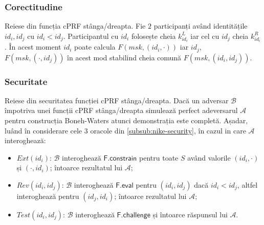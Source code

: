 \documentclass[oneside, 12pt]{book}
\begin{document}
\subsubsection{Corectitudine}

Reiese din funcția cPRF stânga/dreapta. Fie $2$ participanți având identitățile $id_i, id_j$ cu $id_i < id_j$. Participantul cu $id_i$ folosește cheia $k^{L}_{id_i}$ iar cel cu $id_j$ cheia $k^{R}_{id_i}$. În acest moment $id_i$ poate calcula $F(msk, (id_i, \cdot))$ iar $id_j$, $F(msk, (\cdot, id_j))$ în acest mod stabilind cheia comună $F(msk, (id_i, id_j))$.

\subsubsection{Securitate}

Reiese din securitatea funcției cPRF stânga/dreapta. Dacă un adversar $\mathcal{B}$ împotriva unei funcții cPRF stânga/dreapta simulează perfect adeversarul $\mathcal{A}$ pentru construcția Boneh-Waters atunci demonstrația este completă. Așadar, luând în considerare cele $3$ oracole din \ref{subsub:nike-security}, în cazul in care $\mathcal{A}$ interoghează:
\begin{itemize}
	\item $Ext(id_i)$: $\mathcal{B}$ interoghează $\mathsf{F.constrain}$ pentru toate $S$ având valorile $(id_i, \cdot)$ și $(\cdot, id_i)$; întoarce rezultatul lui $\mathcal{A}$;
	\item $Rev(id_i, id_j)$: $\mathcal{B}$ interoghează $\mathsf{F.eval}$ pentru $(id_i, id_j)$ dacă $id_i < id_j$, altfel interoghează pentru $(id_j, id_i)$; întoarce rezultatul lui $\mathcal{A}$;
	\item $Test(id_i, id_j)$: $\mathcal{B}$ interoghează $\mathsf{F.challenge}$ și întoarce răspunsul lui $\mathcal{A}$.
\end{itemize}




\end{document}
